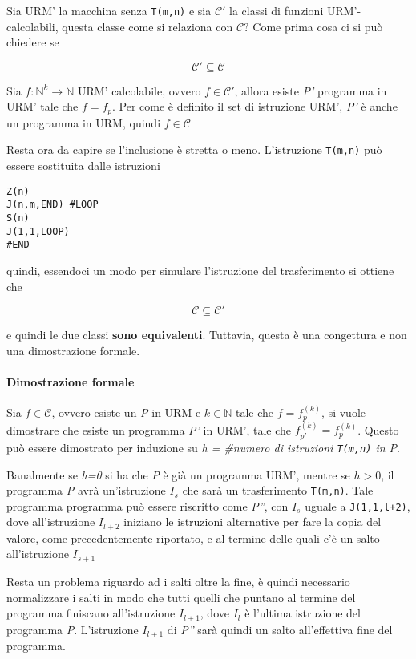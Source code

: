 Sia URM' la macchina senza \texttt{T(m,n)} e sia $\mathcal{C}'$ la classi di funzioni URM'-calcolabili, questa classe come si relaziona con $\mathcal{C}$?
Come prima cosa ci si può chiedere se

$$ \mathcal{C}' \subseteq \mathcal{C} $$

Sia $ f: \mathbb{N}^k \rightarrow \mathbb{N}$ URM' calcolabile, ovvero $ f \in \mathcal{C}' $, allora esiste \emph{P'} programma in URM' tale che $f = f_p$.
Per come è definito il set di istruzione URM', \emph{P'} è anche un programma in URM, quindi $f \in \mathcal{C}$

Resta ora da capire se l'inclusione è stretta o meno. L'istruzione \texttt{T(m,n)} può essere sostituita dalle istruzioni

\begin{lstlisting}[language=URM]
Z(n)
J(n,m,END) #LOOP
S(n)
J(1,1,LOOP)
#END
\end{lstlisting}

quindi, essendoci un modo per simulare l'istruzione del trasferimento si ottiene che

$$
\mathcal{C} \subseteq \mathcal{C}'
$$

e quindi le due classi \textbf{sono equivalenti}. 
Tuttavia, questa è una congettura e non una dimostrazione formale.

\paragraph{Dimostrazione formale} Sia $f \in \mathcal{C}$, ovvero esiste un \emph{P} in URM e $k \in \mathbb{N}$ tale che $f = f_{p}^{(k)}$, si vuole dimostrare che esiste un programma \emph{P'} in URM', tale che $f_{p'}^{(k)} = f_{p}^{(k)}$.
Questo può essere dimostrato per induzione su \emph{h = \#numero di
istruzioni \texttt{T(m,n)} in P}.

Banalmente se \emph{h=0} si ha che \emph{P} è già un programma URM', mentre se $h > 0$, il programma \emph{P} avrà un'istruzione $I_s$ che sarà un trasferimento \texttt{T(m,n)}. 
Tale programma programma può essere riscritto come \emph{P''}, con $I_s$ uguale a \texttt{J(1,1,l+2)}, dove all'istruzione $I_{l+2}$ iniziano le istruzioni alternative per fare la copia del valore, come precedentemente riportato, e al termine delle quali c'è un salto all'istruzione $I_{s+1}$

Resta un problema riguardo ad i salti oltre la fine, è quindi necessario normalizzare i salti in modo che tutti quelli che puntano al termine del programma finiscano all'istruzione $I_{l+1}$, dove $I_l$ è l'ultima istruzione del programma \emph{P}. L'istruzione $I_{l+1}$ di \emph{P''} sarà quindi un salto all'effettiva fine del programma.

